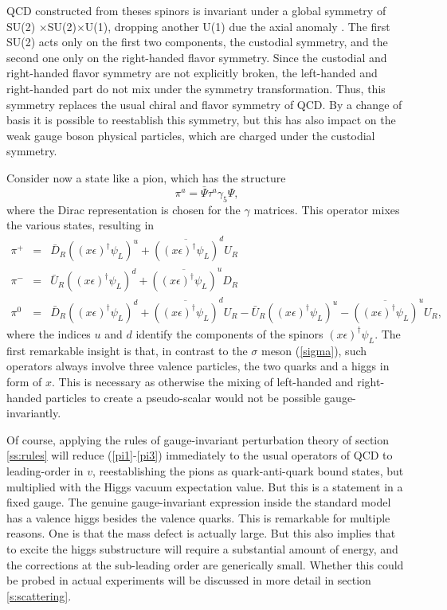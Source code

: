\documentclass[final,twoside,12pt]{article}
\newcommand*{\no}{\noindent}
\newcommand*{\bea}{\begin{eqnarray}}
\newcommand*{\eea}{\end{eqnarray}}
\newcommand*{\be}{\begin{equation}}
\newcommand*{\ee}{\end{equation}}
\newcommand*{\pref}[1]{(\ref{#1})}
\newcommand*{\prefr}[2]{(\ref{#1}-\ref{#2})}
\newcommand*{\nn}{\nonumber}
\newcommand*{\1}{1\!\!\!\bot}
\begin{document}
QCD constructed from theses spinors is invariant under a global symmetry of SU(2) $\times $SU(2)$\times $U(1), dropping another U(1) due the axial anomaly \cite{Bohm:2001yx}. The first SU(2) acts only on the first two components, the custodial symmetry, and the second one only on the right-handed flavor symmetry. Since the custodial and right-handed flavor symmetry are not explicitly broken, the left-handed and right-handed part do not mix under the symmetry transformation. Thus, this symmetry replaces the usual chiral and flavor symmetry of QCD. By a change of basis it is possible to reestablish this symmetry, but this has also impact on the weak gauge boson physical particles, which are charged under the custodial symmetry.

Consider now a state like a pion, which has the structure
\be
\pi^a=\bar{\Psi}\tau^a\gamma_5\Psi\nn,
\ee
\no where the Dirac representation is chosen for the $\gamma$ matrices. This operator mixes the various states, resulting in
\bea
\pi^{+}&=&\bar{D}_R ((x\epsilon)^\dagger\psi_L)^u+\overline{((x\epsilon)^\dagger\psi_L)}^dU_R\label{pi1}\\
\pi^{-}&=&\bar{U}_R ((x\epsilon)^\dagger\psi_L)^d+\overline{((x\epsilon)^\dagger\psi_L)}^uD_R\\
\pi^0&=&\bar{D}_R ((x\epsilon)^\dagger\psi_L)^d+\overline{((x\epsilon)^\dagger\psi_L)}^dU_R-\bar{U}_R ((x\epsilon)^\dagger\psi_L)^u-\overline{((x\epsilon)^\dagger\psi_L)}^uU_R\label{pi3},
\eea
\no where the indices $u$ and $d$ identify the components of the spinors $(x\epsilon)^\dagger\psi_L$. The first remarkable insight is that, in contrast to the $\sigma$ meson \pref{sigma}, such operators always involve three valence particles, the two quarks and a higgs in form of $x$. This is necessary as otherwise the mixing of left-handed and right-handed particles to create a pseudo-scalar would not be possible gauge-invariantly.

Of course, applying the rules of gauge-invariant perturbation theory of section \ref{ss:rules} will reduce \prefr{pi1}{pi3} immediately to the usual operators of QCD to leading-order in $v$, reestablishing the pions as quark-anti-quark bound states, but multiplied with the Higgs vacuum expectation value. But this is a statement in a fixed gauge. The genuine gauge-invariant expression inside the standard model has a valence higgs besides the valence quarks. This is remarkable for multiple reasons. One is that the mass defect is actually large. But this also implies that to excite the higgs substructure will require a substantial amount of energy, and the corrections at the sub-leading order are generically small. Whether this could be probed in actual experiments will be discussed in more detail in section \ref{s:scattering}.
\end{document}
